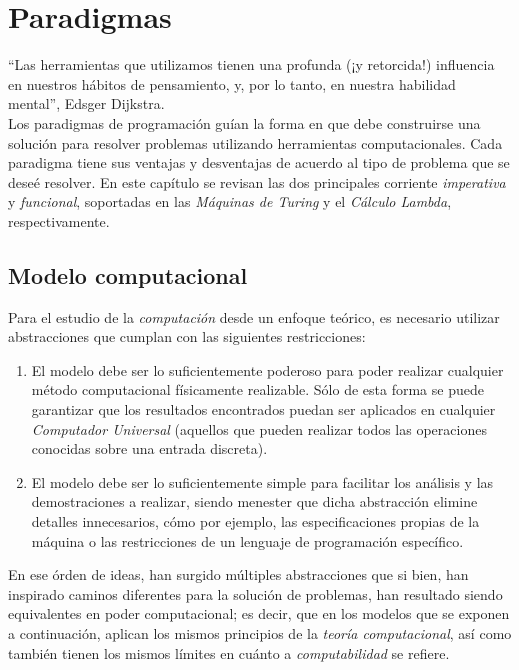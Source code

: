 
\chapter{Paradigmas}

``Las herramientas que utilizamos tienen una profunda (¡y retorcida!) influencia en nuestros hábitos de pensamiento, y, por lo tanto, en nuestra habilidad mental'', Edsger Dijkstra. \\

Los paradigmas de programación guían la forma en que debe construirse una solución para resolver problemas utilizando herramientas computacionales. Cada paradigma tiene sus ventajas y desventajas de acuerdo al tipo de problema que se deseé resolver. En este capítulo se revisan las dos principales corriente \emph{imperativa} y \emph{funcional}, soportadas en las \emph{Máquinas de Turing} y el \emph{Cálculo Lambda}, respectivamente.

\section{Modelo computacional}

Para el estudio de la \emph{computación} desde un enfoque teórico, es necesario utilizar abstracciones que cumplan con las siguientes restricciones:

\begin{enumerate}
	\item El modelo debe ser lo suficientemente poderoso para poder realizar cualquier método computacional físicamente realizable. Sólo de esta forma se puede garantizar que los resultados encontrados puedan ser aplicados en cualquier \emph{Computador Universal} (aquellos que pueden realizar todos las operaciones conocidas sobre una entrada discreta).
	\item El modelo debe ser lo suficientemente simple para facilitar los análisis y las demostraciones a realizar, siendo menester que dicha abstracción elimine detalles innecesarios, cómo por ejemplo, las especificaciones propias de la máquina o las restricciones de un lenguaje de programación específico.
\end{enumerate}  

En ese órden de ideas, han surgido múltiples abstracciones que si bien, han inspirado caminos diferentes para la solución de problemas, han resultado siendo equivalentes en poder computacional; es decir, que en los modelos que se exponen a continuación, aplican los mismos principios de la \emph{teoría computacional}, así como también tienen los mismos límites en cuánto a \emph{computabilidad} se refiere.

